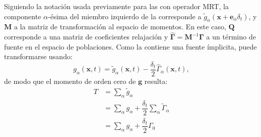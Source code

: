 Siguiendo la notaci\'on usada previamente para las \lbe{} con operador MRT, la componente $\alpha$-\'esima del miembro izquierdo de la  corresponde  a $\tilde{g}_{\alpha}(\bm{x}+\bm{e}_{\alpha}\delta_t)$, y $\bm{M}$ a la matriz de transformaci\'on al espacio de momentos.  En este caso, $\bm{Q}$ corresponde a una matriz de coeficientes relajaci\'on y $\hat{\bm{\Gamma}} = \bm{M}^{-1}\bm{\Gamma}$ a un t\'ermino de fuente en el espacio de poblaciones. Como la  contiene una fuente \'implicita, puede transformarse usando:
\begin{equation}
	g_{\alpha}(\bm{x},t) = \tilde{g}_{\alpha} (\bm{x},t) - \dfrac{\delta_t}{2} \hat{\Gamma}_{\alpha}(\bm{x},t),
	\label{eq:g_tilde_tranf_2d}
\end{equation}
de modo que el momento de orden cero de $\bm{g}$ resulta:
\begin{equation}
	\begin{aligned}
		T &= \sum_{\alpha} \tilde{g}_{\alpha} \\
		  &= \sum_{\alpha} g_{\alpha} + \dfrac{\delta_t}{2} \sum_{\alpha} \tilde{\Gamma}_{\alpha} \\
		  &= \sum_{\alpha} g_{\alpha} + \dfrac{\delta_t}{2} \Gamma_0
	\end{aligned}
	\label{eq:T_macro_2d}
\end{equation}

